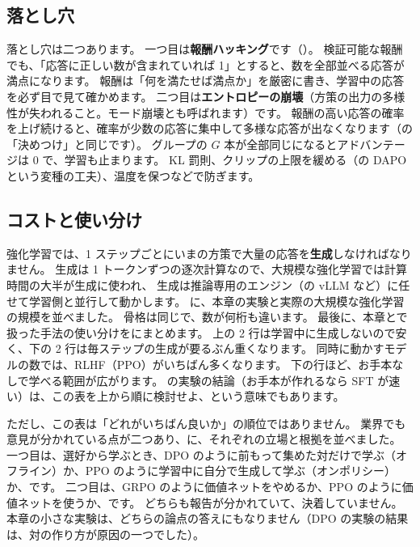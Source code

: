 \subsection{落とし穴}

落とし穴は二つあります。
一つ目は\textbf{報酬ハッキング}です（）。
検証可能な報酬でも、「応答に正しい数が含まれていれば 1」とすると、数を全部並べる応答が満点になります。
報酬は「何を満たせば満点か」を厳密に書き、学習中の応答を必ず目で見て確かめます。
二つ目は\textbf{エントロピーの崩壊}（方策の出力の多様性が失われること。モード崩壊とも呼ばれます）です。
報酬の高い応答の確率を上げ続けると、確率が少数の応答に集中して多様な応答が出なくなります（の「決めつけ」と同じです）。
グループの $G$ 本が全部同じになるとアドバンテージは 0 で、学習も止まります。
KL 罰則、クリップの上限を緩める（の DAPO という変種の工夫）、温度を保つなどで防ぎます。

\subsection{コストと使い分け}

強化学習では、1 ステップごとにいまの方策で大量の応答を\textbf{生成}しなければなりません。
生成は 1 トークンずつの逐次計算なので、大規模な強化学習では計算時間の大半が生成に使われ、
生成は推論専用のエンジン（の vLLM など）に任せて学習側と並行して動かします。
に、本章の実験と実際の大規模な強化学習の規模を並べました。
骨格は同じで、数が何桁も違います。
最後に、本章とで扱った手法の使い分けをにまとめます。
上の 2 行は学習中に生成しないので安く、下の 2 行は毎ステップの生成が要るぶん重くなります。
同時に動かすモデルの数では、RLHF（PPO）がいちばん多くなります。
下の行ほど、お手本なしで学べる範囲が広がります。
の実験の結論（お手本が作れるなら SFT が速い）は、この表を上から順に検討せよ、という意味でもあります。

ただし、この表は「どれがいちばん良いか」の順位ではありません。
業界でも意見が分かれている点が二つあり、に、それぞれの立場と根拠を並べました。
一つ目は、選好から学ぶとき、DPO のように前もって集めた対だけで学ぶ（オフライン）か、PPO のように学習中に自分で生成して学ぶ（オンポリシー）か、です。
二つ目は、GRPO のように価値ネットをやめるか、PPO のように価値ネットを使うか、です。
どちらも報告が分かれていて、決着していません。
本章の小さな実験は、どちらの論点の答えにもなりません（DPO の実験の結果は、対の作り方が原因の一つでした）。

